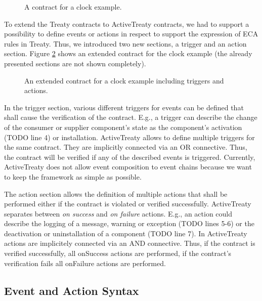 \documentclass{llncs}
\begin{document}
\begin{figure}
  \lstset{ language=XML }
  
  \caption{A contract for a clock example.}
  \label{lst:clock01}
\end{figure}

To extend the Treaty contracts to ActiveTreaty contracts, we had to support a possibility to define events or actions in respect to support the expression of ECA rules in Treaty. Thus, we introduced two new sections, a trigger and an action section. Figure \ref{lst:clock02} shows an extended contract for the clock example (the already presented sections are not shown completely).

\begin{figure}[t]
  \lstset{ language=XML }
  
  \caption{An extended contract for a clock example including triggers and actions.}
  \label{lst:clock02}
\end{figure}

In the trigger section, various different triggers for events can be defined that shall cause the verification of the contract. E.g., a trigger can describe the change of the consumer or supplier component's state as the component's activation (TODO line 4) or installation. ActiveTreaty allows to define multiple triggers for the same contract. They are implicitly connected via an OR connective. Thus, the contract will be verified if any of the described events is triggered. Currently, ActiveTreaty does not allow event composition to event chains because we want to keep the framework as simple as possible.

The action section allows the definition of multiple actions that shall be performed either if the contract is violated or verified successfully. ActiveTreaty separates between \textit{on success} and \textit{on failure} actions. E.g., an action could describe the logging of a message, warning or exception (TODO lines 5-6) or the deactivation or uninstallation of a component (TODO line 7). In ActiveTreaty actions are implicitely connected via an AND connective. Thus, if the contract is verified successfully, all onSuccess actions are performed, if the contract's verification fails all onFailure actions are performed.
	


\subsection{Event and Action Syntax} 
\end{document}
